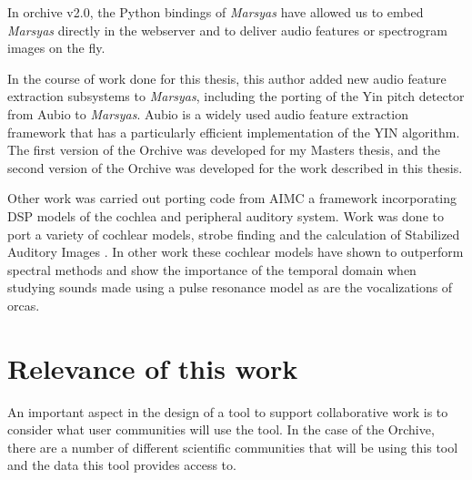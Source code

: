 In orchive v2.0, the Python bindings of \textit{Marsyas} have allowed us to
embed \textit{Marsyas} directly in the webserver and to deliver audio
features or spectrogram images on the fly.

In the course of work done for this thesis, this author added new
audio feature extraction subsystems to \textit{Marsyas}, including the porting
of the Yin pitch detector from Aubio \cite{brossier2006aubio} to
\textit{Marsyas}.  Aubio is a widely used audio feature extraction framework
that has a particularly efficient implementation of the YIN algorithm.
The first version of the Orchive was developed for my Masters thesis,
and the second version of the Orchive was developed for the work
described in this thesis.

Other work was carried out porting code from AIMC \cite{waltersphd} a
framework incorporating DSP models of the cochlea and peripheral
auditory system.  Work was done to port a variety of cochlear
models\cite{lyon2011hearing}\cite{lyon2011cas}, strobe finding and the
calculation of Stabilized Auditory Images \cite{patterson1992complex}.
In other work \cite{rehn2009sparse} these cochlear models have shown
to outperform \cite{chechik08} spectral methods
\cite{duda1990correlograms} and show the importance of the temporal
domain \cite{slaney1993time} when studying sounds made using a pulse
resonance model \cite{waltersphd} as are the vocalizations of orcas.


%
%
\clearpage
\section{Relevance of this work}

An important aspect in the design of a tool to support collaborative
work is to consider what user communities will use the tool.  In the
case of the Orchive, there are a number of different scientific
communities that will be using this tool and the data this tool
provides access to.  

